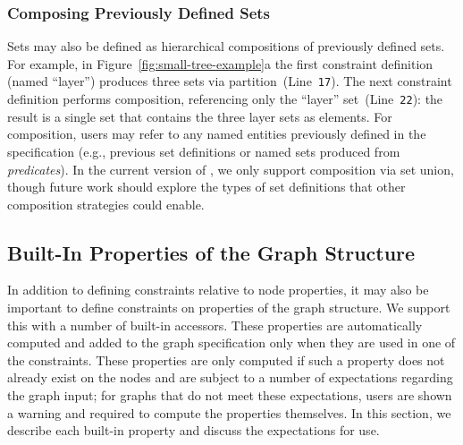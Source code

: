\subsubsection{Composing Previously Defined Sets}
Sets may also be defined as hierarchical
compositions of previously defined sets. For example, in
Figure~\ref{fig:small-tree-example}a the first constraint definition
(named ``layer'') produces three sets via
partition~(Line~\texttt{17}). The next constraint definition performs 
composition, referencing only the ``layer'' set~(Line~\texttt{22}): the result
is a single set that contains the three layer sets as elements.
For composition, users may
refer to any named entities previously defined in the specification (e.g.,
previous set definitions or named sets produced from \emph{predicates}).
In the current version of \projectname, we only support composition via
set union, though future work should explore the types of set definitions
that other composition strategies could enable.

\subsection{Built-In Properties of the Graph Structure}
\label{sec:built-in-properties}

In addition to defining constraints relative to node properties, it may
also be important to define constraints on properties
of the graph structure.  We support this with a number of built-in accessors.
These properties are automatically computed and added to the graph 
specification only when they are used in one of the \projectname constraints. 
These properties are only computed if such a property does not
already exist on the nodes and are subject to a number of expectations
regarding the graph input; for graphs that do not meet these expectations,
users are shown a warning and required to compute the properties
themselves. In this section, we describe each built-in property and discuss 
the expectations for use.



